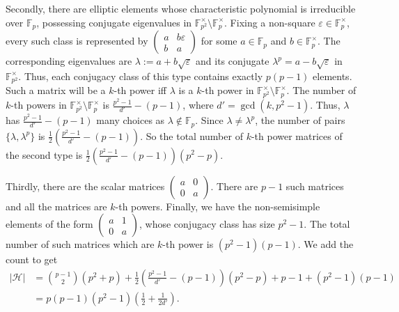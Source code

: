 \documentclass[12pt,reqno]{amsart}
\theoremstyle{plain}
\theoremstyle{definition}
\newcommand{\sH}{{\mathcal H}}
\theoremstyle{remark}
\newcommand{\FF}{\mathbb{F}}
\begin{document}
Secondly, there are elliptic elements whose characteristic polynomial is irreducible over $\FF_p$, possessing conjugate eigenvalues in $\FF_{p^2}^{\times }  \setminus \FF_p^{\times}$. Fixing a non-square $\varepsilon\in \FF_p^{\times}$, every such class is represented by $\begin{pmatrix}
a & b\varepsilon\\ b & a
\end{pmatrix}$
for some $a\in \FF_p$ and $b\in \FF_p^{\times}$. The corresponding eigenvalues are $\lambda:=a+b\sqrt{\varepsilon}$ and its conjugate $\lambda^p=a-b\sqrt{\varepsilon}$ in $\FF_{p^2}^{\times}$. Thus, each conjugacy class of this type contains exactly $p(p-1)$ elements. Such a matrix will be a $k$-th power iff $\lambda$ is a $k$-th power in $\FF_{p^2}^{\times} \setminus \FF_p^\times.$ The number of $k$-th powers in $\FF_{p^2}^{\times} \setminus \FF_p^\times$ is $\frac{p^2-1}{d'} - (p-1)$, where $d' = \gcd(k, p^2-1).$ Thus, $\lambda$ has $\frac{p^2-1}{d'} - (p-1)$ many choices as $\lambda \notin \FF_p$. Since $\lambda \neq \lambda^p$, the number of pairs $\{\lambda, \lambda^p\}$ is $\frac{1}{2}\left(\frac{p^2-1}{d'} - (p-1)\right)$. So the total number of $k$-th power matrices of the second type is $\frac{1}{2}\left(\frac{p^2-1}{d'} - (p-1)\right) (p^2-p).$
 
Thirdly, there are the scalar matrices $\begin{pmatrix}
    a & 0 \\ 0 & a
\end{pmatrix}$. There are $p-1$ such matrices and all the matrices are $k$-th powers.
Finally, we have the non-semisimple elements of the form $\begin{pmatrix}
    a & 1 \\ 0 & a
\end{pmatrix}$, whose conjugacy class has size $p^2-1.$ The total number of such matrices which are $k$-th power is $(p^2-1)(p-1).$ We add the count to get  
\begin{align*}
    |\sH| &= \binom{p-1}{2} (p^2+p) + \frac{1}{2}\left(\frac{p^2-1}{d'} - (p-1)\right) (p^2-p)+ p-1+ (p^2-1)(p-1)\\
    &=p(p-1)(p^2-1) \left(\frac{1}{2} + \frac{1}{2d'}\right) .
\end{align*} 
\end{document}
